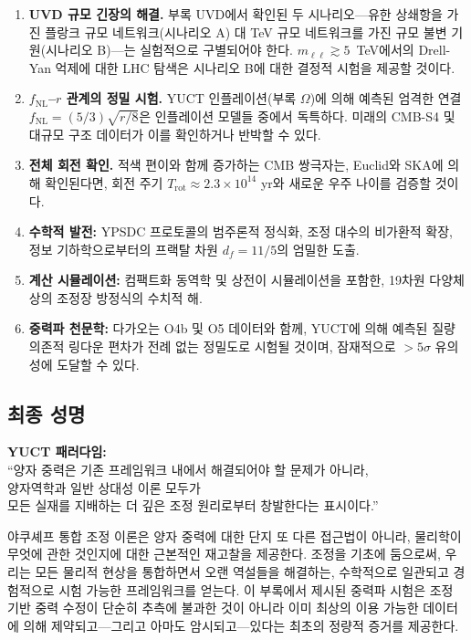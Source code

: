 \documentclass[11pt,a4paper]{article}
\theoremstyle{remark}
\begin{document}
	\begin{enumerate}
		\item \textbf{UVD 규모 긴장의 해결.} 부록 UVD에서 확인된 두 시나리오—유한 상쇄항을 가진 플랑크 규모 네트워크(시나리오 A) 대 TeV 규모 네트워크를 가진 규모 불변 기원(시나리오 B)—는 실험적으로 구별되어야 한다. $m_{\ell\ell}\gtrsim5$~TeV에서의 Drell-Yan 억제에 대한 LHC 탐색은 시나리오 B에 대한 결정적 시험을 제공할 것이다.
		
		\item \textbf{$f_{\mathrm{NL}}$–$r$ 관계의 정밀 시험.} YUCT 인플레이션(부록 $\Omega$)에 의해 예측된 엄격한 연결 $f_{\mathrm{NL}}=(5/3)\sqrt{r/8}$은 인플레이션 모델들 중에서 독특하다. 미래의 CMB-S4 및 대규모 구조 데이터가 이를 확인하거나 반박할 수 있다.
		
		\item \textbf{전체 회전 확인.} 적색 편이와 함께 증가하는 CMB 쌍극자는, Euclid와 SKA에 의해 확인된다면, 회전 주기 $T_{\mathrm{rot}}\approx2.3\times10^{14}$ yr와 새로운 우주 나이를 검증할 것이다.
		
		\item \textbf{수학적 발전:} YPSDC 프로토콜의 범주론적 정식화, 조정 대수의 비가환적 확장, 정보 기하학으로부터의 프랙탈 차원 $d_f=11/5$의 엄밀한 도출.
		
		\item \textbf{계산 시뮬레이션:} 컴팩트화 동역학 및 상전이 시뮬레이션을 포함한, 19차원 다양체 상의 조정장 방정식의 수치적 해.
		
		\item \textbf{중력파 천문학:} 다가오는 O4b 및 O5 데이터와 함께, YUCT에 의해 예측된 질량 의존적 링다운 편차가 전례 없는 정밀도로 시험될 것이며, 잠재적으로 $>5\sigma$ 유의성에 도달할 수 있다.
	\end{enumerate}
	
	\subsection{최종 성명}
	
	\begin{center}
		\textbf{YUCT 패러다임:}\\
		``양자 중력은 기존 프레임워크 내에서 해결되어야 할 문제가 아니라,\\
		양자역학과 일반 상대성 이론 모두가\\
		모든 실재를 지배하는 더 깊은 조정 원리로부터 창발한다는 표시이다.''
	\end{center}
	
	야쿠셰프 통합 조정 이론은 양자 중력에 대한 단지 또 다른 접근법이 아니라, 물리학이 무엇에 관한 것인지에 대한 근본적인 재고찰을 제공한다. 조정을 기초에 둠으로써, 우리는 모든 물리적 현상을 통합하면서 오랜 역설들을 해결하는, 수학적으로 일관되고 경험적으로 시험 가능한 프레임워크를 얻는다. 이 부록에서 제시된 중력파 시험은 조정 기반 중력 수정이 단순히 추측에 불과한 것이 아니라 이미 최상의 이용 가능한 데이터에 의해 제약되고—그리고 아마도 암시되고—있다는 최초의 정량적 증거를 제공한다.
	
\end{document}
